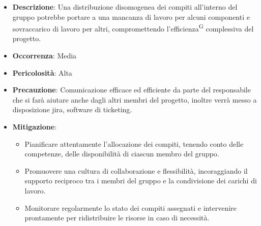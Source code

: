 \documentclass[5pt]{article}
\begin{document}
      \begin{itemize}
        \item \textbf{Descrizione}: Una distribuzione disomogenea dei compiti all'interno del gruppo potrebbe portare a una mancanza di lavoro per alcuni componenti e sovraccarico di lavoro per altri, compromettendo l'efficienza\textsuperscript{G} complessiva del progetto.
        \item \textbf{Occorrenza}: Media
        \item \textbf{Pericolosità}: Alta
        \item \textbf{Precauzione}: Comunicazione efficace ed efficiente da parte del responsabile che si farà aiutare anche dagli altri membri del progetto, inoltre verrà messo a disposizione jira, software di ticketing.
        \item \textbf{Mitigazione}: 
          \begin{itemize}
            \item Pianificare attentamente l'allocazione dei compiti, tenendo conto delle competenze, delle disponibilità di ciascun membro del gruppo.
            \item Promuovere una cultura di collaborazione e flessibilità, incoraggiando il supporto reciproco tra i membri del gruppo e la condivisione dei carichi di lavoro.
            \item Monitorare regolarmente lo stato dei compiti assegnati e intervenire prontamente per ridistribuire le risorse in caso di necessità.
          \end{itemize}
      \end{itemize}
\end{document}
